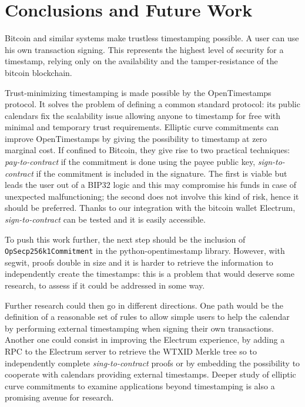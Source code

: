\chapter{Conclusions and Future Work}
\label{chpr:conclusions}
Bitcoin and similar systems make trustless timestamping possible. A user can use his own transaction signing. This represents the highest level of security for a timestamp, relying only on the availability and the tamper-resistance of the bitcoin blockchain.


Trust-minimizing timestamping is made possible by the OpenTimestamps protocol. It solves the problem of defining a common standard protocol: its public calendars fix the scalability issue allowing anyone to timestamp for free with minimal and temporary trust requirements.
Elliptic curve commitments can improve OpenTimestamps by giving the possibility to timestamp at zero marginal cost. 
If confined to Bitcoin, they give rise to two practical techniques: \textit{pay-to-contract} if the commitment is done using the payee public key, \textit{sign-to-contract} if the commitment is included in the signature. 
The first is viable but leads the user out of a BIP32 logic and this may compromise his funds in case of unexpected malfunctioning; the second does not involve this kind of risk, hence it should be preferred. 
Thanks to our integration with the bitcoin wallet Electrum, \textit{sign-to-contract} can be tested and it is easily accessible.


To push this work further, the next step should be the inclusion of \verb|OpSecp256k1Commitment| in the python-opentimestamp library.
However, with segwit, proofs double in size and it is harder to retrieve the information to independently create the timestamps: this is a problem that would deserve some research, to assess if it could be addressed in some way.


Further research could then go in different directions.
One path would be the definition of a reasonable set of rules to allow simple users to help the calendar by performing external timestamping when signing their own transactions.
Another one could consist in improving the Electrum experience, by adding a RPC to the Electrum server to retrieve the WTXID Merkle tree so to independently complete \textit{sing-to-contract} proofs or by embedding the possibility to cooperate with calendars providing external timestamps.
Deeper study of elliptic curve commitments to examine applications beyond timestamping \cite{TapRoot} is also a promising avenue for research.
